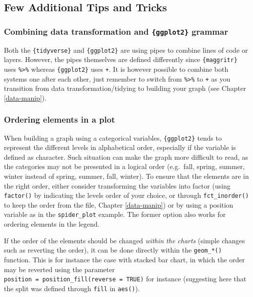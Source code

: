 \documentclass[
]{krantz}
\begin{document}
\hypertarget{tipsntricks}{%
\subsection{Few Additional Tips and Tricks}\label{tipsntricks}}

\hypertarget{combining}{%
\subsubsection*{\texorpdfstring{Combining data transformation and \texttt{\{ggplot2\}} grammar}{Combining data transformation and \{ggplot2\} grammar}}\label{combining}}


Both the \texttt{\{tidyverse\}} and \texttt{\{ggplot2\}} are using pipes to combine lines of code or layers.
However, the pipes themselves are defined differently since \texttt{\{maggritr\}} uses \texttt{\%\textgreater{}\%} whereas \texttt{\{ggplot2\}} uses \texttt{+}.
It is however possible to combine both systems one after each other, just remember to switch from \texttt{\%\textgreater{}\%} to \texttt{+} as you transition from data transformation/tidying to building your graph (see Chapter \ref{data-manip}).

\hypertarget{ordering}{%
\subsubsection*{Ordering elements in a plot}\label{ordering}}


When building a graph using a categorical variables, \texttt{\{ggplot2\}} tends to represent the different levels in alphabetical order, especially if the variable is defined as character. Such situation can make the graph more difficult to read, as the categories may not be presented in a logical order (e.g.~fall, spring, summer, winter instead of spring, summer, fall, winter). To ensure that the elements are in the right order, either consider transforming the variables into factor (using \texttt{factor()} by indicating the levels order of your choice, or through \texttt{fct\_inorder()} to keep the order from the file, Chapter \ref{data-manip}) or by using a position variable as in the \texttt{spider\_plot} example. The former option also works for ordering elements in the legend.

If the order of the elements should be changed \emph{within the charts} (simple changes such as reverting the order), it can be done directly within the \texttt{geom\_*()} function. This is for instance the case with stacked bar chart, in which the order may be reverted using the parameter \texttt{position\ =\ position\_fill(reverse\ =\ TRUE)} for instance (suggesting here that the split was defined through \texttt{fill} in \texttt{aes()}).
\end{document}
